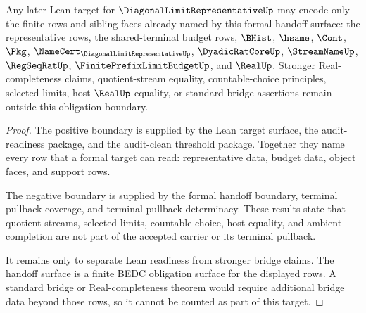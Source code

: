 \begin{theorem}
\label{thm:diagonal-limit-representative-lean-readiness-obligation-boundary}
Any later Lean target for $\DiagonalLimitRepresentativeUp$ may encode only the finite rows and sibling faces already named by this formal handoff surface: the representative rows, the shared-terminal budget rows, $\BHist$, $\hsame$, $\Cont$, $\Pkg$, $\NameCert_{\DiagonalLimitRepresentativeUp}$, $\DyadicRatCoreUp$, $\StreamNameUp$, $\RegSeqRatUp$, $\FinitePrefixLimitBudgetUp$, and $\RealUp$. Stronger Real-completeness claims, quotient-stream equality, countable-choice principles, selected limits, host $\RealUp$ equality, or standard-bridge assertions remain outside this obligation boundary.
\end{theorem}
\begin{proof}
The positive boundary is supplied by the Lean target surface, the audit-readiness package, and the audit-clean threshold package. Together they name every row that a formal target can read: representative data, budget data, object faces, and support rows.

The negative boundary is supplied by the formal handoff boundary, terminal pullback coverage, and terminal pullback determinacy. These results state that quotient streams, selected limits, countable choice, host equality, and ambient completion are not part of the accepted carrier or its terminal pullback.

It remains only to separate Lean readiness from stronger bridge claims. The handoff surface is a finite BEDC obligation surface for the displayed rows. A standard bridge or Real-completeness theorem would require additional bridge data beyond those rows, so it cannot be counted as part of this target.
\end{proof}
